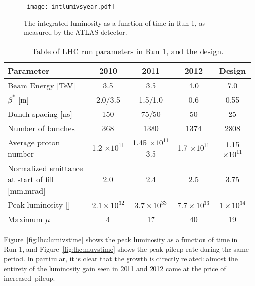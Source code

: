 \begin{figure}
\centering
\texttt{[image: intlumivsyear.pdf]}
\caption{The integrated luminosity as a function of time in Run 1, as measured by the ATLAS detector.}
\label{fig:lhc:lumivsyear}
\end{figure}


\begin{table}
	\caption{Table of LHC run parameters in Run 1, and the design.}
	\label{tab:lhc:parameters}
	\begin{center}
		\begin{tabular}{l|cccc}
		\hline

		\hline
		\textbf{Parameter} & \textbf{2010} & \textbf{2011} & \textbf{2012} & \textbf{Design} \\
		\hline
			 Beam Energy [TeV] & 3.5 &        3.5    &       4.0 &            7.0\\
			 $\beta^*$ [m]      & 2.0/3.5 &     1.5/1.0   &       0.6 &            0.55\\
			 Bunch spacing [ns] & 150 &         75/50   &       50 &             25\\
			 Number of bunches  & 368 &         1380    &       1374 &           2808\\
			 Average proton number  & 1.2 $\times 10^{11}$ &    1.45 $\times 10^{11}$     3.5    &   1.7 $\times 10^{11}$ &     1.15 $\times 10^{11}$\\
			 Normalized emittance at start of fill [mm.mrad]  & 2.0 &    2.4 &      2.5    &   3.75\\
			 Peak luminosity [\lumirate] & $2.1\times 10^{32}$   &  $3.7 \times 10^{33}$   & $7.7 \times 10^{33}$ & $1 \times 10^{34}$ \\
			 Maximum $\mu$ &  4  &  17   &  40 & 19 \\
		\hline

		\hline
		\end{tabular}
	\end{center}
\end{table}

Figure~\ref{fig:lhc:lumivstime} shows the peak luminosity as a function of time in Run 1, and Figure~\ref{fig:lhc:muvstime} shows the peak pileup rate during the same period. In particular, it is clear that the growth is directly related: almost the entirety of the luminosity gain seen in 2011 and 2012 came at the price of increased~pileup.


